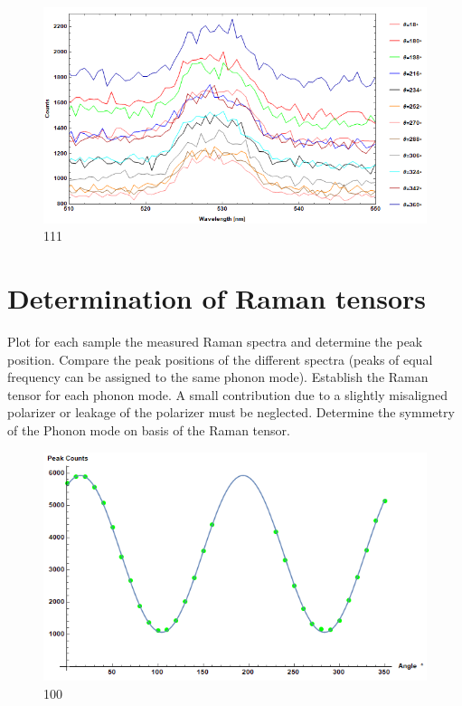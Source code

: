 \documentclass[openany,11pt,a4paper]{report}
\begin{document}
\begin{figure}[H]
\centering
\includegraphics[scale=1]{111collectives.PNG}
\caption{111}
\end{figure}

\section{Determination of Raman tensors}

Plot for each sample the measured Raman spectra and determine the peak
position. Compare the peak positions of the different spectra (peaks of equal
frequency can be assigned to the same phonon mode). Establish the Raman
tensor for each phonon mode. A small contribution due to a slightly misaligned
polarizer or leakage of the polarizer must be neglected. Determine the symmetry
of the Phonon mode on basis of the Raman tensor.

\begin{figure}[H]
\centering
\includegraphics[scale=1]{100peaks.PNG}
\caption{100}
\end{figure}
\end{document}

